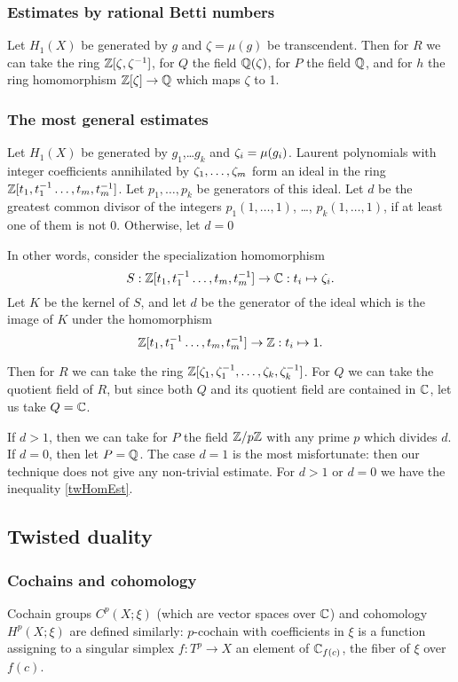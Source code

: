 \documentclass{article}
\numberwithin{equation}{section}
\begin{document}
\subsubsection{Estimates by rational Betti numbers}\label{sT.3.5} Let $H_1(X)$ 
be generated by $g$ and $\zeta=\mu(g)$ be transcendent.
Then for $R$ we can take the ring $\mathbb Z[\zeta,\zeta^{-1}]$, 
for $Q$ the field $\mathbb Q(\zeta)$, 
for $P$ the field $\mathbb Q$, and for $h$ the ring homomorphism $\mathbb Z[\zeta]\to\mathbb Q$
which maps $\zeta$ to 1. 

\subsubsection{The most general estimates}\label{sT.3.6} 
Let $H_1(X)$ be generated by $g_1$,\dots $g_k$ and $\zeta_i=\mu(g_i)$.  
Laurent polynomials with integer coefficients annihilated by  
$\zeta_1,\dots,\zeta_m$ form an ideal in the ring 
$\mathbb Z[t_1,t_1^{-1}\dots,t_m,t_m^{-1}]$. Let $p_1,\dots,p_k$ be generators of
this ideal. 
Let $d$ be the greatest common divisor of the integers 
$p_1(1,\dots,1)$, \dots, $p_k(1,\dots,1)$, if at least one of them is 
not 0. Otherwise, let $d=0$ 

In other words, consider the specialization homomorphism
$$S:\mathbb Z[t_1,t_1^{-1}\dots,t_m,t_m^{-1}]\to \mathbb C: t_i\mapsto\zeta_i.$$
Let $K$ be the kernel of $S$, and let $d$ be the generator of the ideal 
which is the image of $K$ under the homomorphism 
$$\mathbb Z[t_1,t_1^{-1}\dots,t_m,t_m^{-1}]\to\mathbb Z : t_i\mapsto 1.$$

Then for $R$ we can take the ring
$\mathbb Z[\zeta_1,\zeta_1^{-1},\dots,\zeta_k,\zeta_k^{-1}]$. For $Q$ we can take
the quotient field of $R$, but since both $Q$ and its quotient field
are contained in $\mathbb C$, let us take $Q=\mathbb C$.

If $d>1$, then we can take for $P$ the field $\mathbb Z/p\mathbb Z$ with any prime $p$
which divides $d$.  
If $d=0$, then let $P=\mathbb Q$. The case $d=1$ is the most misfortunate:
then our technique does not give any non-trivial estimate.
For $d>1$ or $d=0$ we have the inequality \eqref{twHomEst}.    
 

 
\subsection{Twisted duality}\label{sT.4} 

\subsubsection{Cochains and cohomology}\label{sT.4.1} 
Cochain groups $C^p(X;\xi)$ (which are vector spaces over
$\mathbb C$) and cohomology $H^p(X;\xi)$ are defined similarly:   
$p$-cochain with coefficients in $\xi$ is a function assigning to a
singular simplex $f:T^p\to X$ an element of $\mathbb C_{f(c)}$, the 
fiber of $\xi$ over $f(c)$. 
\end{document}
